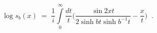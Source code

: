 \begin{equation}
\log s_b(x)\;=\;\frac{1}{i}\int\limits_0^{\infty}\frac{dt}{t}
\biggl(\frac{\sin 2xt}{2\sinh bt\sinh b^{-1}t}-
\frac{x}{t}\biggl)\;\;.
\end{equation}

